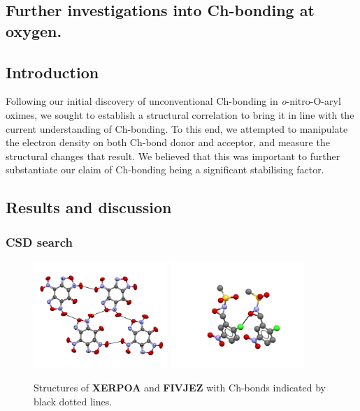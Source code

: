 \begin{refsection}
\chapter{Further investigations into Ch-bonding at oxygen.}\label{app:o-ch-bonding}

\section{Introduction}
Following our initial discovery of unconventional Ch-bonding in \emph{o}-nitro-O-aryl oximes, we sought to establish a structural correlation to bring it in line with the current understanding of Ch-bonding.
To this end, we attempted to manipulate the electron density on both Ch-bond donor and acceptor, and measure the structural changes that result.
We believed that this was important to further substantiate our claim of Ch-bonding being a significant stabilising factor.

\section{Results and discussion}

\subsection{CSD search}

\begin{figure}
    \centering
    \includegraphics[width=0.45\textwidth]{Figures/XERPOA.pdf}
    \includegraphics[width=0.45\textwidth]{Figures/FIVJEZ.pdf}
    \caption[Structures of \textbf{XERPOA} and \textbf{FIVJEZ}.]{Structures of \textbf{XERPOA} and \textbf{FIVJEZ} with Ch-bonds indicated by black dotted lines.}\label{fig:furoxan-oxaziridine}
\end{figure}


\end{refsection}
